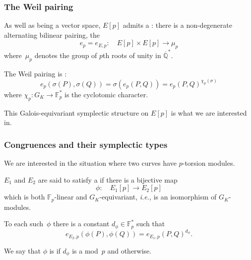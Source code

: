 \documentclass[compress]{beamer}
\newcommand{\Q}{\mathbb Q}
\newcommand{\Qbar}{\overline{\Q}}
\newcommand{\F}{\mathbb F}
\newcommand{\high}[1]{\emph{\color{blue}{#1}}}
\begin{document}
\begin{frame}\frametitle{The Weil pairing}
  As well as being a vector space, $E[p]$ admits a \high{symplectic
    structure}: there is a non-degenerate alternating bilinear
  pairing, the \high{Weil pairing}
  \[
  e_p = e_{E,p}:\quad E[p]\times E[p] \to \mu_p
  \]
  where~$\mu_p$ denotes the group of $p$th roots of unity in
  $\Qbar^*$.
  \pause\medskip

  The Weil pairing is \high{Galois equivariant}:
  \[
  e_p(\sigma(P),\sigma(Q)) = \sigma(e_p(P,Q)) = e_p(P,Q)^{\chi_p(\sigma)}
  \]
  where $\chi_p:G_K\to\F_p^*$ is the cyclotomic character.

  \pause\medskip This Galois-equivariant symplectic structure on $E[p]$ is
  what we are interested in.
\end{frame}

\begin{frame}\frametitle{Congruences and their symplectic types}
  We are interested in the situation where two \high{different} curves have
  \high{isomorphic} $p$-torsion modules.
  \pause\medskip

  $E_1$ and $E_2$ are said to satisfy a \high{mod~$p$ congruence} if
  there is a bijective map
  \[
  \phi:\quad E_1[p] \to E_2[p]
  \]
  which is both $\F_p$-linear and $G_K$-equivariant, \textit{i.e.}, is
  an isomorphism of $G_K$-modules.
  \pause\medskip

  To each such~$\phi$ there is a constant $d_{\phi}\in\F_p^*$ such
  that
  \[
  e_{E_2,p}(\phi(P),\phi(Q)) = e_{E_1,p}(P,Q)^{d_{\phi}}.
  \]

  We say that $\phi$ is \high{symplectic} if $d_{\phi}$ is a
  \high{square} mod~$p$ and \high{anti-symplectic} otherwise.
\end{frame}



\end{document}

